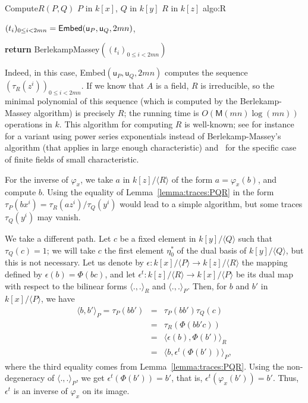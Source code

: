 \documentclass{sig-alternate}
\def\M {\ensuremath{\mathsf{M}}}
\def\vu {\ensuremath{\mathsf{u}}}
\newcounter{algo}
\newenvironment{algorithm_endline}[4]{\small\begin{center}\begin{minipage}{0.48\textwidth}
      \refstepcounter{algo}
      \label{#4}
      \sf
      \rule{\textwidth}{0.2pt}\\
      \makebox[\textwidth][c]{Algorithm~\arabic{algo}:~\textbf{#1}}\\
      \rule[0.5\baselineskip]{\textwidth}{0.2pt}\\

      \vspace{-12pt}

      \parbox{\textwidth}{\textbf{Input} #2}
      \parbox{\textwidth}{\textbf{Output} #3}

\vspace{-7pt}

      \begin{enumerate*}}{\end{enumerate*}
      \vspace{-11pt}
      \rule{\textwidth}{0.2pt}
\end{minipage}\end{center}
}
\newcommand{\ang}[1]{\langle#1\rangle}
\begin{document}
\begin{algorithm_endline}
{Compute$R(P,Q)$}
{$P$ in $k[x]$, $Q$ in $k[y]$}
{$R$ in $k[z]$}
{algo:R}
\item $(t_i)_{0 \le i < 2mn}={\sf Embed}(\vu_P,\vu_Q,2mn)$,
\item {\bf return} BerlekampMassey$((t_i)_{0 \le i < 2mn})$
\end{algorithm_endline}

Indeed, in this case, {\sf Embed}$(\vu_P,\vu_Q,2mn)$ computes the sequence
$(\tau_R(z^i))_{0\le i < 2mn}$. If we know that $A$ is a field, $R$ is
irreducible, so the minimal polynomial of this sequence (which is
computed by the Berlekamp-Massey algorithm) is precisely $R$; the
running time is $O(\M(mn)\log(mn))$ operations in $k$. This algorithm
for computing $R$ is well-known; see for instance~\cite{BoFlSaSc06}
for a variant using power series exponentials instead of
Berlekamp-Massey's algorithm (that applies in large enough
characteristic) and~\cite{BGPS05} for the specific case of finite
fields of small characteristic.


For the inverse of $\varphi_x$, we take $a$ in $k[z]/\langle R
\rangle$ of the form $a=\varphi_x(b)$, and compute $b$. Using the
equality of Lemma~\ref{lemma:traces:PQR} in the form $\tau_P(b x^i)
=\tau_R(a z^i)/\tau_Q(y^i)$ would lead to a simple algorithm, but some
traces $\tau_Q(y^i)$ may vanish. 

We take a different path. Let $c$ be a fixed element in $k[y]/\ang{Q}$
such that $\tau_Q(c)=1$; we will take $c$ the first element
$\eta^\ast_0$ of the dual basis of $k[y]/\ang{Q}$, but this is not
necessary. Let us denote by $\epsilon: k[x]/\ang{P} \to k[z]/\ang{R}$
the mapping defined by $\epsilon(b) = \Phi(b c)$, and let $\epsilon^t:
k[z]/\ang{R} \to k[x]/\ang{P}$ be its dual map with respect to the
bilinear forms $\ang{.,.}_R$ and $\ang{.,.}_P$. Then, for $b$ and $b'$
in $k[x]/\ang{P}$, we have
\begin{eqnarray*}
\ang{b,b'}_P = \tau_P(b b') &=&  \tau_P(b b')\tau_Q(c) \\
&=& \tau_R( \Phi(b b' c))\\
&=& \ang{\epsilon(b), \Phi(b')}_R \\
&=& \ang{b, \epsilon^t(\Phi(b'))}_P,
\end{eqnarray*}
where the third equality comes from
Lemma~\ref{lemma:traces:PQR}. Using the non-degeneracy of
$\ang{.,.}_P$, we get $\epsilon^t(\Phi(b')) = b'$, that is,
$\epsilon^t(\varphi_x(b')) = b'$. Thus, $\epsilon^t$ is an inverse of
$\varphi_x$ on its image.
\end{document}
